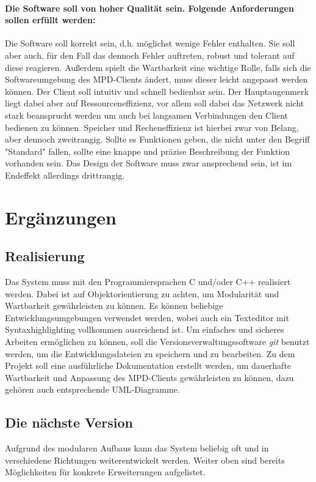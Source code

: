 \paragraph{Die Software soll von hoher Qualität sein. Folgende Anforderungen sollen erfüllt werden:} 
Die Software soll korrekt sein, d.h. möglichst wenige Fehler enthalten.
Sie soll aber auch, für den Fall das dennoch Fehler auftreten, robust
und tolerant auf diese reagieren. Außerdem spielt die Wartbarkeit 
eine wichtige Rolle, falls sich die Softwareumgebung des MPD-Clients
ändert, muss dieser leicht angepasst werden können.
Der Client soll intuitiv und schnell bedienbar sein.
Der Hauptaugenmerk liegt dabei aber auf Ressourceneffizienz, vor allem soll dabei 
das Netzwerk nicht stark beansprucht werden um auch bei langsamen Verbindungen den Client
bedienen zu können. Speicher und Recheneffizienz ist hierbei zwar von Belang, aber dennoch zweitrangig. 
Sollte es Funktionen geben, die nicht unter den Begriff "Standard" fallen, sollte eine knappe
und präzise Beschreibung der Funktion vorhanden sein.
Das Design der Software muss zwar ansprechend sein, ist im Endeffekt allerdings drittrangig.

\section{Ergänzungen}
\subsection{Realisierung}
Das System muss mit den Programmiersprachen C und/oder C++ realisiert werden. Dabei ist auf
Objektorientierung zu achten, um Modularität und Wartbarkeit gewährleisten zu können.
Es können beliebige Entwicklungsumgebungen verwendet werden, wobei auch ein Texteditor mit Syntaxhighlighting vollkommen ausreichend ist.
Um einfaches und sicheres Arbeiten ermöglichen zu können, soll die Versionsverwaltungssoftware \emph{git} benutzt werden, um die
Entwicklungsdateien zu speichern und zu bearbeiten. Zu dem Projekt soll eine ausführliche
Dokumentation erstellt werden, um dauerhafte Wartbarkeit und Anpassung des MPD-Clients gewährleisten
zu können, dazu gehören auch entsprechende UML-Diagramme. 
\subsection{Die nächste Version}
Aufgrund des modularen Aufbaus kann das System beliebig oft und in verschiedene Richtungen weiterentwickelt werden.
Weiter oben sind bereits Möglichkeiten für konkrete Erweiterungen aufgelistet.

